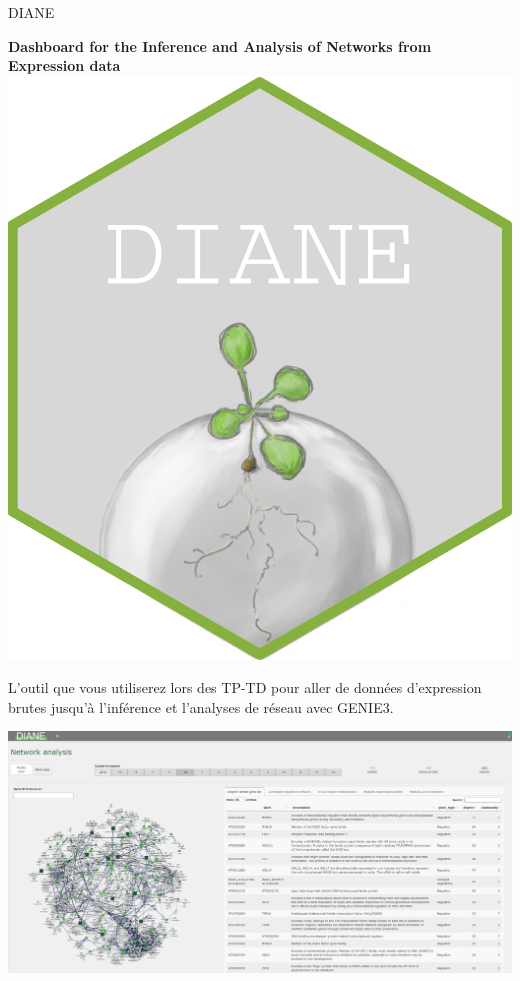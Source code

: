\begin{frame}{DIANE \scriptsize \cite{Cassan2021} }

\scriptsize \textbf{Dashboard for the Inference and Analysis of Networks from Expression data} \includegraphics[scale= 0.10]{Figures/Regression/hex-DIANE.png}

\scriptsize L'outil que vous utiliserez lors des TP-TD pour aller de données d'expression brutes jusqu'à l'inférence et l'analyses de réseau avec GENIE3.

\includegraphics[scale = 0.2]{Figures/Regression/view_net.PNG}

\end{frame}






